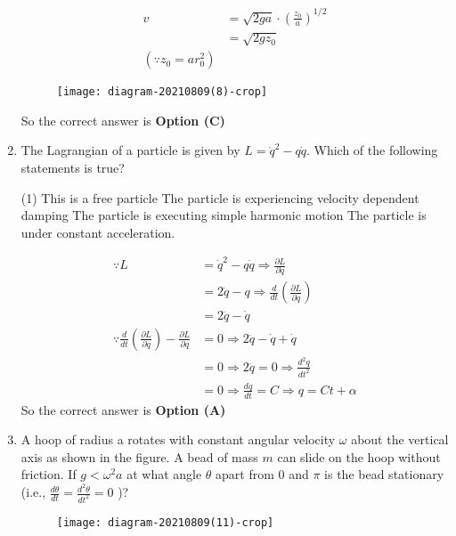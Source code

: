 \begin{enumerate}
\begin{answer}
\begin{align*}
	v&=\sqrt{2 g a} \cdot\left(\frac{z_{0}}{a}\right)^{1 / 2}\\&=\sqrt{2 g z_{0}}\\
	\left(\because z_{0}=a r_{0}^{2}\right)
	\end{align*}
	\begin{figure}[H]
		\centering
		\texttt{[image: diagram-20210809(8)-crop]}
	\end{figure}
	So the correct answer is \textbf{Option (C)}
\end{answer}
	\item The Lagrangian of a particle is given by $L=\dot{q}^{2}-q \dot{q}$. Which of the following statements is true?
	{}
	\begin{tasks}(1)
		\task[\textbf{A.}]  This is a free particle
		\task[\textbf{B.}] The particle is experiencing velocity dependent damping
		\task[\textbf{C.}] The particle is executing simple harmonic motion
		\task[\textbf{D.}] The particle is under constant acceleration.
	\end{tasks}
\begin{answer}
	\begin{align*}
	\because L&=\dot{q}^{2}-q \dot{q} \Rightarrow \frac{\partial L}{\partial \dot{q}}\\&=2 \dot{q}-q \Rightarrow \frac{d}{d t}\left(\frac{\partial L}{\partial \dot{q}}\right)\\&=2 \ddot{q}-\dot{q}\\
	\because \frac{d}{d t}\left(\frac{\partial L}{\partial \dot{q}}\right)-\frac{\partial L}{\partial q}&=0
	\Rightarrow 2 \ddot{q}-\dot{q}+\dot{q}\\&=0 \Rightarrow 2 \ddot{q}=0 \Rightarrow \frac{d^{2} q}{d t^{2}}\\&=0 \Rightarrow \frac{d q}{d t}=C \Rightarrow q=C t+\alpha
	\end{align*}
	So the correct answer is \textbf{Option (A)}
\end{answer}
	\item A hoop of radius a rotates with constant angular velocity $\omega$ about the
	vertical axis as shown in the figure. A bead of mass $m$ can slide on the
	hoop without friction. If $g<\omega^{2} a$ at what angle $\theta$ apart from 0 and $\pi$ is the bead stationary (i.e., $\frac{d \theta}{d t}=\frac{d^{2} \theta}{d t^{2}}=0$ )?
	{}
	\begin{figure}[H]
		\centering
		\texttt{[image: diagram-20210809(11)-crop]}
	\end{figure}

\end{enumerate}
